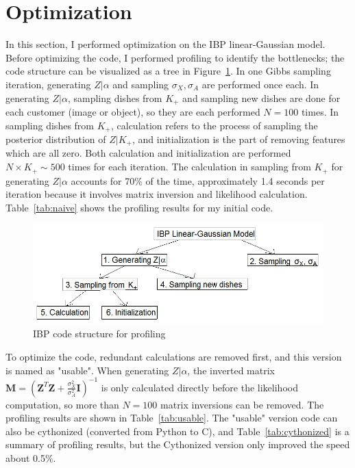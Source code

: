 \section{Optimization}
In this section, I performed optimization on the IBP linear-Gaussian model. Before optimizing the code, I performed profiling to identify the bottlenecks; the code structure can be visualized as a tree in Figure~\ref{fig:profiling}. In one Gibbs sampling iteration, generating $Z|\alpha$ and sampling $\sigma_X,\sigma_A$ are performed once each. In generating $Z|\alpha$, sampling dishes from $K_+$ and sampling new dishes are done for each customer (image or object), so they are each performed $N=100$ times. In sampling dishes from $K_+$, calculation refers to the process of sampling the posterior distribution of $Z|K_+$, and initialization is the part of removing features which are all zero. Both calculation and initialization are performed $N\times K_+ \sim 500$ times for each iteration. The calculation in sampling from $K_+$ for generating $Z|\alpha$ accounts for 70\% of the time, approximately 1.4 seconds per iteration because it involves matrix inversion and likelihood calculation. Table~\ref{tab:naive} shows the profiling results for my initial code. \\

\begin{figure}[!ht]
\centering
    \includegraphics[width=\linewidth]{IBP_profiling.png}
    \caption{IBP code structure for profiling}
    \label{fig:profiling}
\end{figure}

To optimize the code, redundant calculations are removed first, and this version is named as "usable". When generating $Z|\alpha$, the inverted matrix $\mathbf{M} = (\mathbf{Z}^T\mathbf{Z}+\frac{\sigma_X^2}{\sigma_A^2}\mathbf{I})^{-1}$ is only calculated directly before the likelihood computation, so more than $N = 100$ matrix inversions can be removed. The profiling results are shown in Table~\ref{tab:usable}. The "usable" version code can also be cythonized (converted from Python to C), and Table~\ref{tab:cythonized} is a summary of profiling results, but the Cythonized version only improved the speed about 0.5\%.\\

